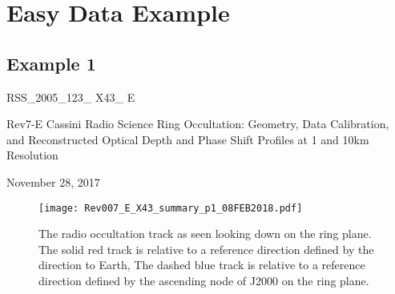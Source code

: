 \documentclass[crop=false,class=book]{standalone}
\begin{document}
\chapter{Easy Data Example}
\section{Example 1}
\begin{center}
    \LARGE{RSS\_2005\_123\_ X43\_ E \par
    Rev7-E Cassini Radio Science Ring Occultation: Geometry, Data Calibration, and Reconstructed Optical Depth and Phase Shift Profiles at 1 and 10km Resolution \par
    November 28, 2017\par}
\end{center}
\begin{figure}[H]
    \centering
    \texttt{[image: Rev007\_E\_X43\_summary\_p1\_08FEB2018.pdf]}
    \caption*{The radio occultation track as seen looking down on the ring plane. The solid red track is relative to a reference direction defined by the direction to Earth, The dashed blue track is relative to a reference direction defined by the ascending node of J2000 on the ring plane.}
\end{figure}
\end{document}
